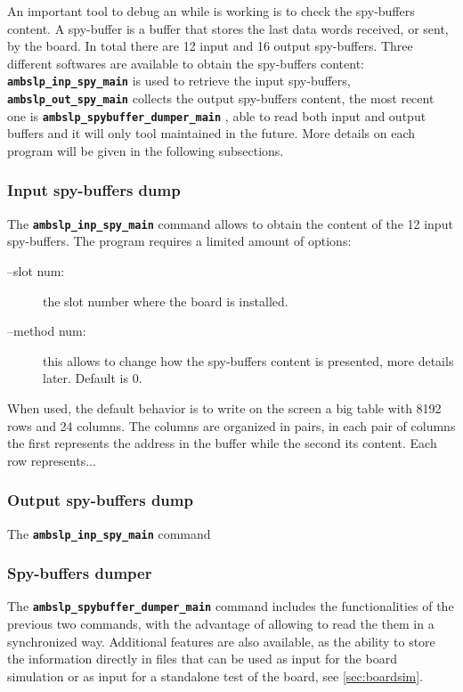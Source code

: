 An important tool to debug an \AMBoard while is working is to check the
spy-buffers content. A spy-buffer is a buffer that stores the last data words
received, or sent, by the board. In total there are 12 input and 16 output
spy-buffers. Three different softwares are available to obtain the spy-buffers
content: \textbf{\texttt{ambslp\_inp\_spy\_main}}
 is used to retrieve
the input spy-buffers, \textbf{\texttt{ambslp\_out\_spy\_main}}
collects the output spy-buffers content, 
the most recent one is 
\textbf{\texttt{ambslp\_spybuffer\_dumper\_main}}
, able to read
both input and output buffers and it will only tool maintained in the future.
More details on each program will be given in the following subsections.

\subsubsection{Input spy-buffers dump}

The \textbf{\texttt{ambslp\_inp\_spy\_main}}
command
allows to obtain the content of the 12 input spy-buffers. The program 
requires a limited amount of options:
\begin{description}
\item[--slot num:] the slot number where the board is installed.

\item[--method num:] this allows to change how the spy-buffers content is presented,
more details later. Default is 0.
\end{description}

When used, the default behavior is to write on the screen a big table with 8192 rows
and 24 columns. The columns are organized in pairs, in 
each pair of columns the first represents the address in the buffer while the second
its content. Each row represents...

\subsubsection{Output spy-buffers dump}

The \textbf{\texttt{ambslp\_inp\_spy\_main}} command

\subsubsection{Spy-buffers dumper}
The \textbf{\texttt{ambslp\_spybuffer\_dumper\_main}}
 command includes
the functionalities of the previous two commands, with the advantage of allowing to
read the them in a synchronized way. Additional features are also available, as
the ability to store the information directly in files that can be used as input
for the board simulation or as input for a standalone test of the board, see
\ref{sec:boardsim}.